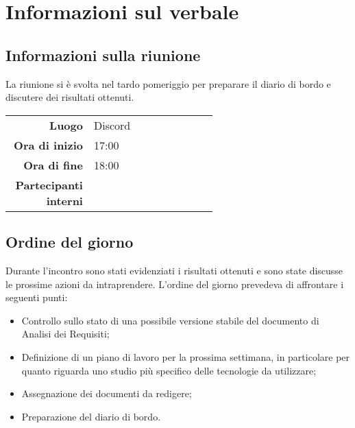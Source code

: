 \section{Informazioni sul verbale}

\subsection{Informazioni sulla riunione}
La riunione si è svolta nel tardo pomeriggio per preparare il diario di bordo e discutere dei risultati ottenuti.

\begin{center}
	\begin{tabular}{r|p{0.6\linewidth}}
		\toprule
		\textbf{Luogo} & Discord \\
		\textbf{Ora di inizio} & 17:00 \\
		\textbf{Ora di fine} & 18:00 \\
		\textbf{Partecipanti interni} & \groupTeam
	\end{tabular}
\end{center}

\medskip

\subsection{Ordine del giorno}
Durante l'incontro sono stati evidenziati i risultati ottenuti e sono state discusse le prossime azioni da intraprendere. L'ordine del giorno prevedeva di affrontare i seguenti punti:
\begin{itemize}
	\item Controllo sullo stato di una possibile versione stabile del documento di Analisi dei Requisiti;
	\item Definizione di un piano di lavoro per la prossima settimana, in particolare per quanto riguarda uno studio più specifico delle tecnologie da utilizzare;
	\item Assegnazione dei documenti da redigere;
	\item Preparazione del diario di bordo.
\end{itemize}
